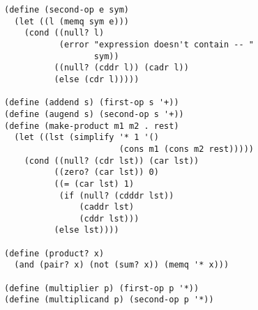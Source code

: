 \documentclass[a4paper,12pt]{article}
\begin{document}
\begin{lstlisting}
(define (second-op e sym)
  (let ((l (memq sym e)))
    (cond ((null? l)
           (error "expression doesn't contain -- "
                  sym))
          ((null? (cddr l)) (cadr l))
          (else (cdr l)))))

(define (addend s) (first-op s '+))
(define (augend s) (second-op s '+))
(define (make-product m1 m2 . rest)
  (let ((lst (simplify '* 1 '()
                       (cons m1 (cons m2 rest)))))
    (cond ((null? (cdr lst)) (car lst))
          ((zero? (car lst)) 0)
          ((= (car lst) 1)
           (if (null? (cdddr lst))
               (caddr lst)
               (cddr lst)))
          (else lst))))

(define (product? x)
  (and (pair? x) (not (sum? x)) (memq '* x)))

(define (multiplier p) (first-op p '*))
(define (multiplicand p) (second-op p '*))
\end{lstlisting}
\end{document}
